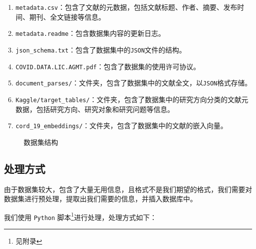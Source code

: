 \documentclass[UTF8,openany]{ctexbook}
\begin{document}
\begin{enumerate}
    \item \texttt{metadata.csv}：包含了文献的元数据，包括文献标题、作者、摘要、发布时间、期刊、全文链接等信息。
    \item \texttt{metadata.readme}：包含数据集内容的更新日志。
    \item \texttt{json\_schema.txt}：包含了数据集中的\texttt{JSON}文件的结构。
    \item \texttt{COVID.DATA.LIC.AGMT.pdf}：包含了数据集的使用许可协议。
    \item \texttt{document\_parses/}：文件夹，包含了数据集中的文献全文，以\texttt{JSON}格式存储。
    \item \texttt{Kaggle/target\_tables/}：文件夹，包含了数据集中的研究方向分类的文献元数据，包括研究方向、研究对象和研究问题等信息。
    \item \texttt{cord\_19\_embeddings/}：文件夹，包含了数据集中的文献的嵌入向量。

\end{enumerate}
\begin{figure}[H]
    \caption{数据集结构}
    \label{fig:dataset}
\end{figure}




\subsection{处理方式}

由于数据集较大，包含了大量无用信息，且格式不是我们期望的格式，我们需要对数据集进行预处理，提取出我们需要的信息，并插入数据库中。

我们使用 \texttt{Python} 脚本\footnote{见附录}进行处理，处理方式如下：
\end{document}
